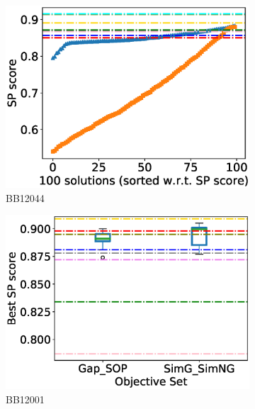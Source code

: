 \begin{figure}[!htbp]
\begin{adjustwidth}{-1cm}{-1cm}
\begin{subfigure}{0.22\textwidth}
			\includegraphics[width=\columnwidth]{Figure/summary/precomputedInit/Balibase/BB12044_pairs_density_single_run_2}
			\caption{BB12044}
		\end{subfigure}
		\begin{subfigure}{0.22\textwidth}
			\includegraphics[width=\columnwidth]{Figure/summary/precomputedInit/Balibase/BB12001_objset_pairs_rank_2}
			\caption{BB12001}
		\end{subfigure}	
		\begin{subfigure}{0.22\textwidth}

\end{subfigure}
\end{adjustwidth}
\end{figure}
